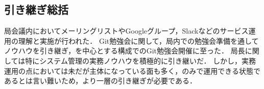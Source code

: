 \subsection*{引き継ぎ総括}


局会議内においてメーリングリストやGoogleグループ，Slackなどのサービス運用の理解と実施が行われた．
Git勉強会に関して，局内での勉強会準備を通してノウハウを引き継ぎ，\secondGrade{}を中心とする構成でのGit勉強会開催に至った．
局長に関しては特にシステム管理の実務ノウハウを積極的に引き継いだ．
しかし，実務運用の点においては未だ\fourthGrade{}が主体になっている面も多く，\secondGrade{}のみで運用できる状態であるとは言い難いため，より一層の引き継ぎが必要である．
